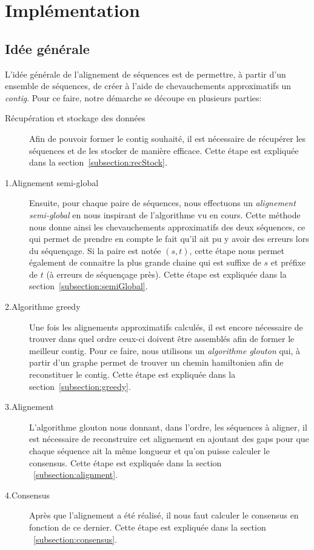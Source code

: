 \section{Implémentation}

\subsection{Idée générale}

	L'idée générale de l'alignement de séquences est de permettre, à partir d'un ensemble de séquences, de créer à l'aide de chevauchements approximatifs un \emph{contig}. Pour ce faire, notre démarche se découpe en plusieurs parties:

	\begin{description}
		\item[Récupération et stockage des données] Afin de pouvoir former le contig souhaité, il est nécessaire de récupérer les séquences et de les stocker de manière efficace. Cette étape est expliquée dans la section~\ref{subsection:recStock}.

		\item[1.Alignement semi-global] Ensuite, pour chaque paire de séquences,
			nous effectuons un \emph{alignement semi-global} en nous inspirant
			de l'algorithme vu en cours. Cette méthode nous donne ainsi
			les chevauchements approximatifs des deux séquences, ce qui permet de
			prendre en compte le fait qu'il ait pu y avoir des erreurs lors du
			séquençage. Si la paire est notée $(s, t)$, cette étape nous permet également de connaitre la plus
			grande chaine qui est suffixe de $s$ et préfixe de $t$ (à erreurs de séquençage près). Cette étape
			est expliquée dans la section~\ref{subsection:semiGlobal}.

		\item[2.Algorithme greedy] Une fois les alignements approximatifs
			calculés, il est encore nécessaire de trouver dans quel ordre
			ceux-ci doivent être assemblés afin de former le meilleur contig.
			Pour ce faire, nous utilisons un \emph{algorithme glouton} qui, à
			partir d'un graphe permet de trouver un chemin hamiltonien afin de
			reconstituer le contig. Cette étape est expliquée dans la
			section~\ref{subsection:greedy}.

		\item[3.Alignement]
			L'algorithme glouton nous donnant, dans l'ordre, les séquences à
			aligner, il est nécessaire de reconstruire cet alignement en
			ajoutant des gaps pour que chaque séquence ait la même longueur et
			qu'on puisse calculer le consensus. Cette étape est expliquée dans
			la section ~\ref{subsection:alignment}.

		\item[4.Consensus]
			Après que l'alignement a été réalisé, il nous faut calculer le
			consensus en fonction de ce dernier. Cette étape est expliquée dans
			la section ~\ref{subsection:consensus}.
	\end{description}

